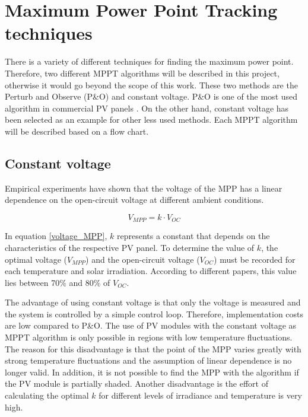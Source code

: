 \section{Maximum Power Point Tracking techniques\label{MPPTalgo}}

There is a variety of different techniques for finding the maximum power point. Therefore, two different MPPT algorithms will be described in this project, otherwise it would go beyond the scope of this work. These two methods are the Perturb and Observe (P\&O) and constant voltage. P\&O is one of the most used algorithm in commercial PV panels \cite{Dezso}. On the other hand, constant voltage has been selected as an example for other less used methods. Each MPPT algorithm will be described based on a flow chart. 

\subsection{Constant voltage}
Empirical experiments have shown that the voltage of the MPP has a linear dependence on the open-circuit voltage at different ambient conditions\cite{flowchartVC}.

\begin{equation} \label{voltage_MPP}
V_{MPP} = k \cdot V_{OC}	
\end{equation} 

In equation \ref{voltage_MPP}, $k$ represents a constant that depends on the characteristics of the respective PV panel. To determine the value of $k$, the optimal voltage ($V_{MPP}$) and the open-circuit voltage ($V_{OC}$) must be recorded for each temperature and solar irradiation. According to different papers, this value lies between 70\% and 80\% of $V_{OC}$\cite{MPPTResearch}\cite{MPPTConstV}.


The advantage of using constant voltage is that only the voltage is measured and the system is controlled by a simple control loop. Therefore, implementation costs are low compared to P\&O. The use of PV modules with the constant voltage as MPPT algorithm is only possible in regions with low temperature fluctuations. The reason for this disadvantage is that the point of the MPP varies greatly with strong temperature fluctuations and the assumption of linear dependence is no longer valid. In addition, it is not possible to find the MPP with the algorithm if the PV module is partially shaded. Another disadvantage is the effort of calculating the optimal $k$ for different levels of irradiance and temperature is very high.\cite{flowchartVC} \cite{MPPTConstV}


